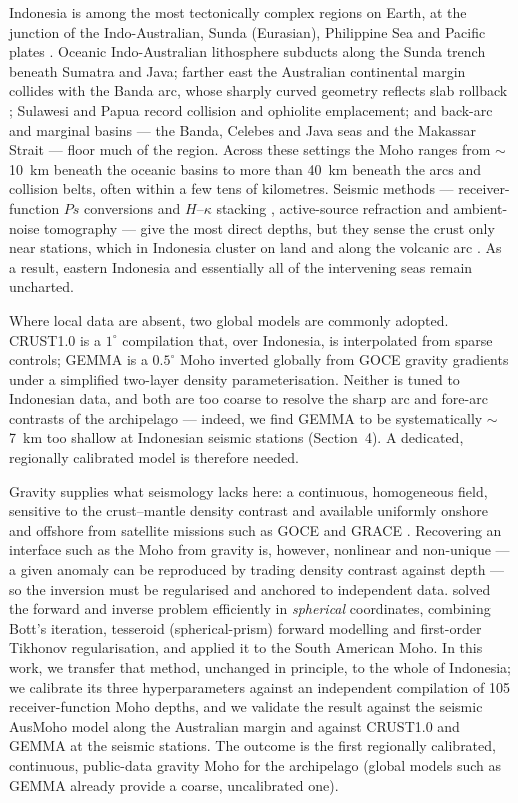 \documentclass{agujournal2019}
\begin{document}
Indonesia is among the most tectonically complex regions on Earth, at the junction
of the Indo-Australian, Sunda (Eurasian), Philippine Sea and Pacific plates
\cite{hamilton1979,hall2002}. Oceanic Indo-Australian lithosphere subducts along
the Sunda trench beneath Sumatra and Java; farther east the Australian continental
margin collides with the Banda arc, whose sharply curved geometry reflects slab
rollback \cite{spakman2010}; Sulawesi and Papua record collision and ophiolite
emplacement; and back-arc and marginal basins --- the Banda, Celebes and Java seas
and the Makassar Strait --- floor much of the region. Across these settings the
Moho ranges from $\sim$10~km beneath the oceanic basins to more than 40~km beneath
the arcs and collision belts, often within a few tens of kilometres. Seismic
methods --- receiver-function $Ps$ conversions and $H$--$\kappa$ stacking
\cite{zhu2000}, active-source refraction and ambient-noise tomography --- give the
most direct depths, but they sense the crust only near stations, which in Indonesia
cluster on land and along the volcanic arc \cite{zhang2023}. As a result, eastern
Indonesia and essentially all of the intervening seas remain uncharted.

Where local data are absent, two global models are commonly adopted. CRUST1.0
\cite{laske2013} is a $1^{\circ}$ compilation that, over Indonesia, is interpolated
from sparse controls; GEMMA \cite{reguzzoni2013,reguzzoni2015,rossi2022} is a
$0.5^{\circ}$ Moho inverted globally from GOCE gravity gradients under a simplified
two-layer density parameterisation. Neither is tuned to Indonesian data, and both
are too coarse to resolve the sharp arc and fore-arc contrasts of the archipelago
--- indeed, we find GEMMA to be systematically $\sim$7~km too shallow at Indonesian
seismic stations (Section~4). A dedicated, regionally calibrated model is therefore
needed.

Gravity supplies what seismology lacks here: a continuous, homogeneous field,
sensitive to the crust--mantle density contrast and available uniformly onshore and
offshore from satellite missions such as GOCE and GRACE \cite{kvas2021}. Recovering
an interface such as the Moho from gravity is, however, nonlinear and non-unique ---
a given anomaly can be reproduced by trading density contrast against depth --- so
the inversion must be regularised and anchored to independent data. 
solved the forward and inverse problem efficiently in \emph{spherical} coordinates,
combining Bott's \cite{bott1960} iteration, tesseroid (spherical-prism) forward
modelling \cite{uieda2016} and first-order Tikhonov regularisation, and applied it
to the South American Moho. In this work, we transfer that method, unchanged in
principle, to the whole of Indonesia; we calibrate its three hyperparameters against
an independent compilation of 105 receiver-function Moho depths, and we validate the
result against the seismic AusMoho model \cite{kennett2011} along the Australian
margin and against CRUST1.0 and GEMMA at the seismic stations. The outcome is the
first regionally calibrated, continuous, public-data gravity Moho for the archipelago (global models such as GEMMA already provide a coarse, uncalibrated one).
\end{document}
